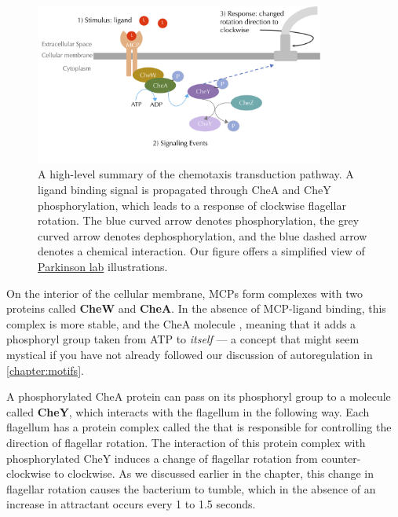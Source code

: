 \begin{figure}[h]
\centering
\mySfFamily
\includegraphics[width = 0.85\textwidth]{../images/chemotaxisphosnew.png}
\caption{A high-level summary of the chemotaxis transduction pathway. A ligand binding signal is propagated through CheA and CheY phosphorylation, which leads to a response of clockwise flagellar rotation. The blue curved arrow denotes phosphorylation, the grey curved arrow denotes dephosphorylation, and the blue dashed arrow denotes a chemical interaction. Our figure offers a simplified view of \href{http://chemotaxis.biology.utah.edu/Parkinson_Lab/projects/ecolichemotaxis/ecolichemotaxis.html}{Parkinson lab} illustrations.}
\label{fig:chemotaxisphosnew}
\end{figure}


On the interior of the cellular membrane, MCPs form complexes with two proteins called \textbf{CheW} and \textbf{CheA}. In the absence of MCP-ligand binding, this complex is more stable, and the CheA molecule , meaning that it adds a phosphoryl group taken from ATP to \textit{itself} --- a concept that might seem mystical if you have not already followed our discussion of autoregulation in \autoref{chapter:motifs}.

A phosphorylated CheA protein can pass on its phosphoryl group to a molecule called \textbf{CheY}, which interacts with the flagellum in the following way. Each flagellum has a protein complex called the  that is responsible for controlling the direction of flagellar rotation. The interaction of this protein complex with phosphorylated CheY induces a change of flagellar rotation from counter-clockwise to clockwise. As we discussed earlier in the chapter, this change in flagellar rotation causes the bacterium to tumble, which in the absence of an increase in attractant occurs every 1 to 1.5 seconds.


